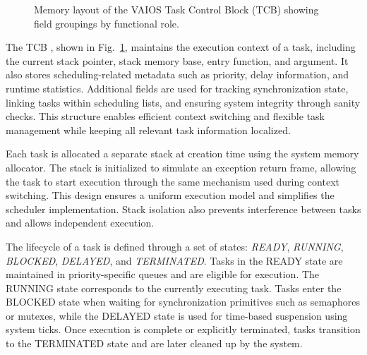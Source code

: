 \begin{figure}[H]
    \caption{Memory layout of the VAIOS Task Control Block (TCB) showing field groupings by functional role.}
    \label{fig:vaios_tcb}
\end{figure}

The TCB , shown in Fig.~\ref{fig:vaios_tcb}, maintains the execution context of a task, including the current stack pointer, stack memory base, entry function, and argument. It also stores scheduling-related metadata such as priority, delay information, and runtime statistics. Additional fields are used for tracking synchronization state, linking tasks within scheduling lists, and ensuring system integrity through sanity checks. This structure enables efficient context switching and flexible task management while keeping all relevant task information localized.

Each task is allocated a separate stack at creation time using the system memory allocator. The stack is initialized to simulate an exception return frame, allowing the task to start execution through the same mechanism used during context switching. This design ensures a uniform execution model and simplifies the scheduler implementation. Stack isolation also prevents interference between tasks and allows independent execution.

The lifecycle of a task is defined through a set of states: \textit{READY}, \textit{RUNNING}, \textit{BLOCKED}, \textit{DELAYED}, and \textit{TERMINATED}. Tasks in the READY state are maintained in priority-specific queues and are eligible for execution. The RUNNING state corresponds to the currently executing task. Tasks enter the BLOCKED state when waiting for synchronization primitives such as semaphores or mutexes, while the DELAYED state is used for time-based suspension using system ticks. Once execution is complete or explicitly terminated, tasks transition to the TERMINATED state and are later cleaned up by the system.

